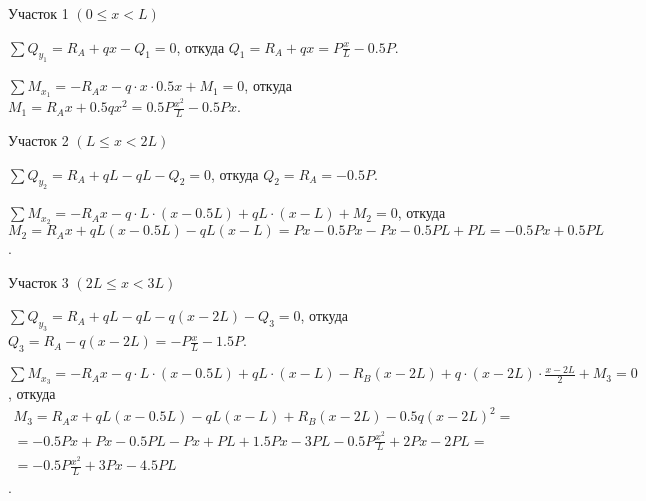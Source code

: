 Участок 1 $ \left(0 \le x < L\right) $

$ \sum Q_{y_1} = R_A + qx - Q_1 = 0 $,
откуда $ Q_1 = R_A + qx = P\frac{x}{L} - 0.5P $.

$ \sum M_{x_1} = -R_A x - q \cdot x \cdot 0.5x + M_1 = 0 $,
откуда $ M_1 = R_A x + 0.5qx^2 = 0.5P\frac{x^2}{L} - 0.5Px $.

\vspace{1.5ex}

Участок 2 $ \left(L \le x < 2L\right) $

$ \sum Q_{y_2} = R_A + qL - qL - Q_2 = 0 $,
откуда $ Q_2 = R_A = -0.5P $.

$ \sum M_{x_2} = -R_A x - q \cdot L \cdot (x - 0.5L) + qL \cdot (x - L) + M_2 = 0 $,
откуда $ M_2 = R_A x + qL(x - 0.5L) - qL(x - L) = Px - 0.5Px - Px - 0.5PL + PL = -0.5Px + 0.5PL $.

\vspace{1.5ex}

Участок 3 $ \left(2L \le x < 3L\right) $

$ \sum Q_{y_3} = R_A + qL - qL - q(x - 2L) - Q_3 = 0 $,
откуда $ Q_3 = R_A - q(x - 2L) = -P\frac{x}{L} - 1.5P $.

$ \sum M_{x_3} = -R_A x - q \cdot L \cdot (x - 0.5L) + qL \cdot (x - L) - R_B (x - 2L) + q \cdot (x - 2L) \cdot \frac{x-2L}{2} + M_3 = 0 $,
откуда 
\begin{multline*}
    M_3 = R_A x + qL(x - 0.5L) - qL(x - L) + R_B (x - 2L) - 0.5q(x - 2L)^2 = \\
    = -0.5Px + Px - 0.5PL - Px + PL + 1.5Px - 3PL - 0.5P\frac{x^2}{L} + 2Px - 2PL = \\
    = -0.5P\frac{x^2}{L} + 3Px - 4.5PL 
\end{multline*}.



















